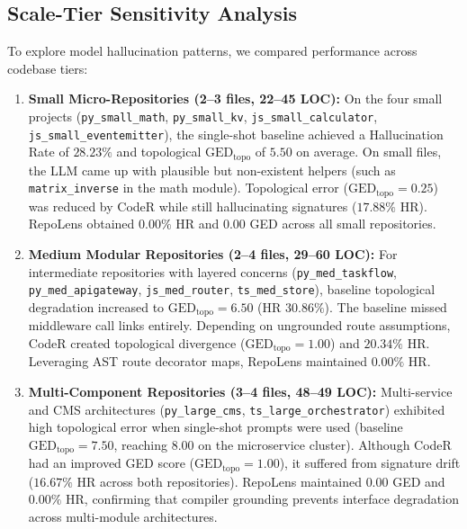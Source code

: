 \documentclass[conference]{IEEEtran}
\begin{document}
\subsection{Scale-Tier Sensitivity Analysis}
To explore model hallucination patterns, we compared performance across codebase tiers:
\begin{enumerate}
    \item \textbf{Small Micro-Repositories (2--3 files, 22--45 LOC):} On the four small projects (\texttt{py\_small\_math}, \texttt{py\_small\_kv}, \texttt{js\_small\_calculator}, \texttt{js\_small\_eventemitter}), the single-shot baseline achieved a Hallucination Rate of $28.23\%$ and topological $\mathrm{GED}_{\mathrm{topo}}$ of $5.50$ on average. On small files, the LLM came up with plausible but non-existent helpers (such as \texttt{matrix\_inverse} in the math module). Topological error ($\mathrm{GED}_{\mathrm{topo}} = 0.25$) was reduced by CodeR while still hallucinating signatures ($17.88\%$ HR). RepoLens obtained $0.00\%$ HR and $0.00$ GED across all small repositories.
    \item \textbf{Medium Modular Repositories (2--4 files, 29--60 LOC):} For intermediate repositories with layered concerns (\texttt{py\_med\_taskflow}, \texttt{py\_med\_apigateway}, \texttt{js\_med\_router}, \texttt{ts\_med\_store}), baseline topological degradation increased to $\mathrm{GED}_{\mathrm{topo}} = 6.50$ (HR $30.86\%$). The baseline missed middleware call links entirely. Depending on ungrounded route assumptions, CodeR created topological divergence ($\mathrm{GED}_{\mathrm{topo}} = 1.00$) and $20.34\%$ HR. Leveraging AST route decorator maps, RepoLens maintained $0.00\%$ HR.
    \item \textbf{Multi-Component Repositories (3--4 files, 48--49 LOC):} Multi-service and CMS architectures (\texttt{py\_large\_cms}, \texttt{ts\_large\_orchestrator}) exhibited high topological error when single-shot prompts were used (baseline $\mathrm{GED}_{\mathrm{topo}} = 7.50$, reaching $8.00$ on the microservice cluster). Although CodeR had an improved GED score ($\mathrm{GED}_{\mathrm{topo}} = 1.00$), it suffered from signature drift ($16.67\%$ HR across both repositories). RepoLens maintained $0.00$ GED and $0.00\%$ HR, confirming that compiler grounding prevents interface degradation across multi-module architectures.
\end{enumerate}
\end{document}
